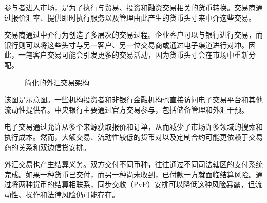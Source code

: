 参与者进入市场，是为了执行与贸易、投资和融资交易相关的货币转换。交易商通过报价汇率、提供即时执行服务以及管理由此产生的货币头寸来中介这些交易。

交易商通过中介行为创造了多层次的交易过程。企业客户可以与银行进行交易，而银行则可以将这些头寸与另一客户、另一位交易商或通过电子渠道进行对冲。因此，一笔客户交易可能会引发更多的交易活动，因为货币头寸会在市场中重新分配。

\begin{figure}[H]
\centering


\caption{简化的外汇交易架构}
\label{fig:ch10-fx-market-architecture}
\end{figure}

该图是示意图。一些机构投资者和非银行金融机构也直接访问电子交易平台和其他流动性提供者。中央银行主要通过官方交易参与，包括储备管理和外汇干预。

电子交易通过允许从多个来源获取报价和订单，从而减少了市场许多领域的搜索和执行成本。然而，大额交易、流动性较低的货币对以及定制合约可能更依赖于交易商的关系和双边信贷安排。

外汇交易也产生结算义务。双方交付不同币种，往往通过不同司法辖区的支付系统完成。如果一种货币已交付，而另一种尚未收到，已付款一方就面临结算风险。通过将两种货币的结算相联系，同步交收（PvP）安排可以降低这种风险暴露，但流动性、操作和法律风险仍可能存在。

